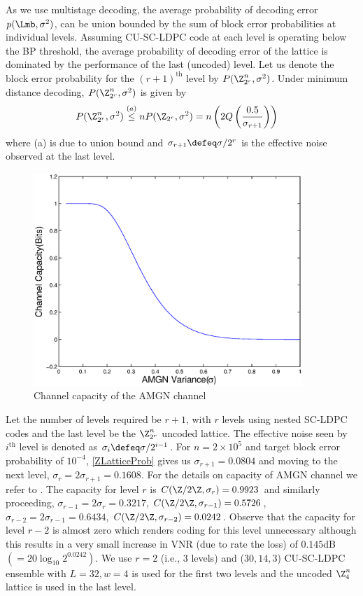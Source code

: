 \documentclass[journal]{IEEEtran}
\begin{document}
As we use multistage decoding, the average probability of decoding error $p(\Lmb,\sigma^{2})$, can be union bounded by the sum of block error probabilities at individual levels. Assuming CU-SC-LDPC code at each level is operating below the BP threshold, the average probability of decoding error of the lattice is dominated by the performance of the last (uncoded) level. 
Let us denote the block error probability for the $(r+1)^{\text{th}}$ level by $P(\Z_{2^r}^{n},\sigma^{2})$. Under minimum distance decoding, $P(\Z_{2^r}^{n},\sigma^{2})$ is given by
\begin{align}
P(\Z_{2^r}^{n},\sigma^{2})&\overset{(a)}\leq nP(\Z_{2^r},\sigma^{2})=n\left(2Q\left(\frac{0.5}{\sigma_{r+1}}\right)	\right)
\label{ZLatticeProb}
\end{align}
where (a) is due to union bound and $\sigma_{r+1}\defeq \sigma/2^r$ is the effective noise observed at the last level.
\begin{figure}[h!]
\centering
\includegraphics[width=4in]{./figures/Cap_integer_coset_lattice.eps}
\caption{Channel capacity of the AMGN channel}
\label{AMGNCapacity}
\end{figure}

Let the number of levels required be $r+1$, with $r$ levels using nested SC-LDPC codes and the last level be the $\Z_{2^r}^{n}$ uncoded lattice. The effective noise seen by $i^{\text{th}}$ level is denoted as $\sigma_{i}\defeq\sigma/2^{i-1}$. For $n=2 \times 10^{5}$ and target block error probability of $10^{-4}$, \eqref{ZLatticeProb} gives us $\sigma_{r+1}= 0.0804$ and moving to the next level, $\sigma_{r}=2\sigma_{r+1}=0.1608$. For the details on capacity of AMGN channel we refer to \cite{forney2000}. The capacity for level $r$ is $C(\Z/2\Z,\sigma_{r})=0.9923$ and similarly proceeding, $\sigma_{r-1}=2\sigma_{r}=0.3217$, $C(\Z/2\Z,\sigma_{r-1})=0.5726$, $\sigma_{r-2}=2\sigma_{r-1}=0.6434$, $C(\Z/2\Z,\sigma_{r-2})=0.0242$.
Observe that the capacity for level $r-2$ is almost zero which renders coding for this level unnecessary although this results in a very small increase in VNR (due to rate the loss) of $0.145$dB $(=20\log_{10}2^{0.0242})$. We use $r=2$ (i.e., 3 levels) and ($30,14,3$) CU-SC-LDPC ensemble with $L=32, w=4$ is used for the first two levels and the uncoded $\Z_{4}^{n}$ lattice is used in the last level.
\end{document}
